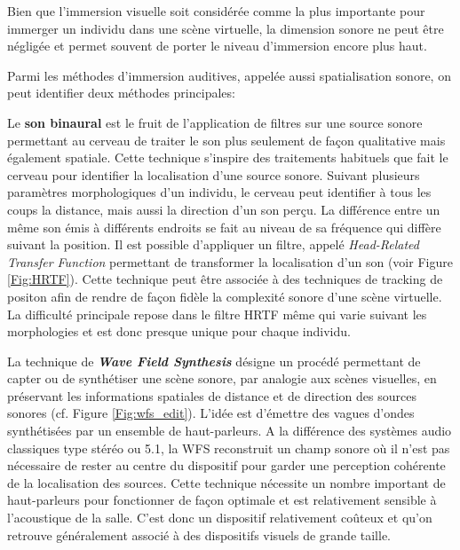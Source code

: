 Bien que l'immersion visuelle soit considérée comme la plus importante pour immerger un individu dans une scène virtuelle, la dimension sonore ne peut être négligée et permet souvent de porter le niveau d'immersion encore plus haut.

Parmi les méthodes d'immersion auditives, appelée aussi spatialisation sonore, on peut identifier deux méthodes principales:

Le \textbf{son binaural} est le fruit de l'application de filtres sur une source sonore permettant au cerveau de traiter le son plus seulement de façon qualitative mais également spatiale. Cette technique s'inspire des traitements habituels que fait le cerveau pour identifier la localisation d'une source sonore. Suivant plusieurs paramètres morphologiques d'un individu, le cerveau peut identifier à tous les coups la distance, mais aussi la direction d'un son perçu. La différence entre un même son émis à différents endroits se fait au niveau de sa fréquence qui diffère suivant la position. Il est possible d'appliquer un filtre, appelé \textit{Head-Related Transfer Function} permettant de transformer la localisation d'un son (voir Figure \ref{Fig:HRTF}). Cette technique peut être associée à des techniques de tracking de positon afin de rendre de façon fidèle la complexité sonore d'une scène virtuelle. La difficulté principale repose dans le filtre HRTF même qui varie suivant les morphologies et est donc presque unique pour chaque individu.

La technique de \textit{\textbf{Wave Field Synthesis}} désigne un procédé permettant de capter ou de synthétiser une scène sonore, par analogie aux scènes visuelles, en préservant les informations spatiales de distance et de direction des sources sonores (cf. Figure \ref{Fig:wfs_edit}). L'idée est d'émettre des vagues d'ondes synthétisées par un ensemble de haut-parleurs. A la différence des systèmes audio classiques type stéréo ou 5.1, la WFS reconstruit un champ sonore où il n'est pas nécessaire de rester au centre du dispositif pour garder une perception cohérente de la localisation des sources.
Cette technique nécessite un nombre important de haut-parleurs pour fonctionner de façon optimale et est relativement sensible à l'acoustique de la salle. C'est donc un dispositif relativement coûteux et qu'on retrouve généralement associé à des dispositifs visuels de grande taille.

